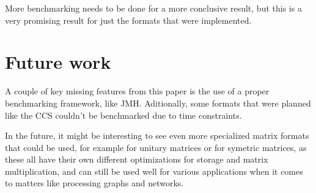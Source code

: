\documentclass{article}
\begin{document}
More benchmarking needs to be done for a more conclusive result,
but this is a very promising result for just the formats that were implemented.

\section{Future work}

A couple of key missing features from this paper is the
use of a proper benchmarking framework, like JMH.
Aditionally, some formats that were planned like the CCS
couldn't be benchmarked due to time constraints.

In the future, it might be interesting to see even more specialized matrix formats that could be used,
for example for unitary matrices or for symetric matrices,
as these all have their own different optimizations for storage and matrix multiplication, and can still
be used well for various applications when it comes to matters like processing graphs and networks.
\end{document}
